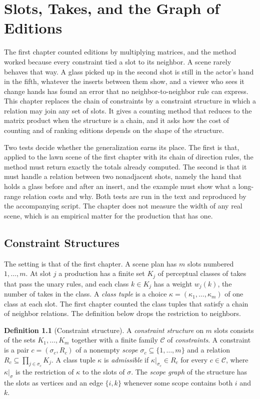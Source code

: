 \documentclass[11pt,twoside,openright]{book}
\theoremstyle{plain}
\theoremstyle{definition}
\newtheorem{definition}[theorem]{Definition}
\theoremstyle{remark}
\begin{document}
\chapter{Slots, Takes, and the Graph of Editions}
\label{ch:graph}

The first chapter counted editions by multiplying matrices, and the method worked because every constraint tied a slot to its neighbor. A scene rarely behaves that way. A glass picked up in the second shot is still in the actor's hand in the fifth, whatever the inserts between them show, and a viewer who sees it change hands has found an error that no neighbor-to-neighbor rule can express. This chapter replaces the chain of constraints by a constraint structure in which a relation may join any set of slots. It gives a counting method that reduces to the matrix product when the structure is a chain, and it asks how the cost of counting and of ranking editions depends on the shape of the structure.

Two tests decide whether the generalization earns its place. The first is that, applied to the lawn scene of the first chapter with its chain of direction rules, the method must return exactly the totals already computed. The second is that it must handle a relation between two nonadjacent shots, namely the hand that holds a glass before and after an insert, and the example must show what a long-range relation costs and why. Both tests are run in the text and reproduced by the accompanying script. The chapter does not measure the width of any real scene, which is an empirical matter for the production that has one.

\section{Constraint Structures}\label{sec:structures}

The setting is that of the first chapter. A scene plan has $m$ slots numbered $1,\dots,m$. At slot $j$ a production has a finite set $K_j$ of perceptual classes of takes that pass the unary rules, and each class $k\in K_j$ has a weight $w_j(k)$, the number of takes in the class. A \emph{class tuple} is a choice $\kappa=(\kappa_1,\dots,\kappa_m)$ of one class at each slot. The first chapter counted the class tuples that satisfy a chain of neighbor relations. The definition below drops the restriction to neighbors.

\begin{definition}[Constraint structure]\label{def:structure}
A \emph{constraint structure} on $m$ slots consists of the sets $K_1,\dots,K_m$ together with a finite family $\mathcal C$ of \emph{constraints}. A constraint is a pair $c=(\sigma_c,R_c)$ of a nonempty \emph{scope} $\sigma_c\subseteq\{1,\dots,m\}$ and a relation $R_c\subseteq\prod_{j\in\sigma_c}K_j$. A class tuple $\kappa$ is \emph{admissible} if $\kappa|_{\sigma_c}\in R_c$ for every $c\in\mathcal C$, where $\kappa|_{\sigma}$ is the restriction of $\kappa$ to the slots of $\sigma$. The \emph{scope graph} of the structure has the slots as vertices and an edge $\{i,k\}$ whenever some scope contains both $i$ and $k$.
\end{definition}
\end{document}
